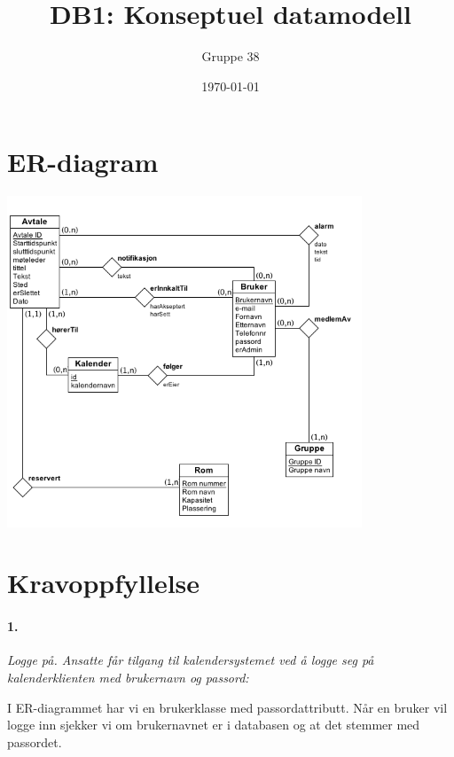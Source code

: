 \documentclass[titlepage]{article}
\author{Gruppe 38}
\title{DB1: Konseptuel datamodell}
\date{\today}
\begin{document}
\maketitle

\tableofcontents

\newpage


\section{ER-diagram}
\includegraphics[width=400px]{er-diagram.png}

\newpage

\section{Kravoppfyllelse}
\paragraph{1.}\textit{ Logge på. Ansatte får tilgang til kalendersystemet ved å logge seg på kalenderklienten med brukernavn og passord:}

I ER-diagrammet har vi en brukerklasse med passordattributt. Når en bruker vil logge inn sjekker vi om brukernavnet er i databasen og at det stemmer med passordet.
\end{document}

